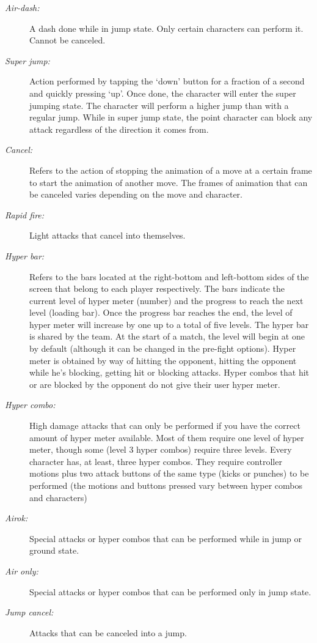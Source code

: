 \documentclass{article}
\begin{document}
\begin{flushleft}
\begin{description}
\item[\textit{Air-dash:}] A dash done while in jump state. Only certain characters can perform it. Cannot be canceled.
\item[\textit{Super jump:}] Action performed by tapping the `down' button for a fraction of a second and quickly pressing `up'. Once done, the character will enter the super jumping state. The character will perform a higher jump than with a regular jump. While in super jump state, the point character can block any attack regardless of the direction it comes from. 
\item[\textit{Cancel:}] Refers to the action of stopping the animation of a move at a certain frame to start the animation of another move. The frames of animation that can be canceled varies depending on the move and character.
\item[\textit{Rapid fire:}] Light attacks that cancel into themselves.
\item[\textit{Hyper bar:}] Refers to the bars located at the right-bottom and left-bottom sides of the screen that belong to each player respectively. The bars indicate the current level of hyper meter (number) and the progress to reach the next level (loading bar). Once the progress bar reaches the end, the level of hyper meter will increase by one up to a total of five levels. The hyper bar is shared by the team. At the start of a match, the level will begin at one by default (although it can be changed in the pre-fight options). Hyper meter is obtained by way of hitting the opponent, hitting the opponent while he's blocking, getting hit or blocking attacks. Hyper combos that hit or are blocked by the opponent do not give their user hyper meter.
\item[\textit{Hyper combo:}] High damage attacks that can only be performed if you have the correct amount of hyper meter available. Most of them require one level of hyper meter, though some (level 3 hyper combos) require three levels. Every character has, at least, three hyper combos. They require controller motions plus two attack buttons of the same type (kicks or punches) to be performed (the motions and buttons pressed vary between hyper combos and characters)
\item[\textit{Airok:}] Special attacks or hyper combos that can be performed while in jump or ground state.
\item[\textit{Air only:}] Special attacks or hyper combos that can be performed only in jump state.
\item[\textit{Jump cancel:}] Attacks that can be canceled into a jump.

\end{description}
\end{flushleft}
\end{document}
